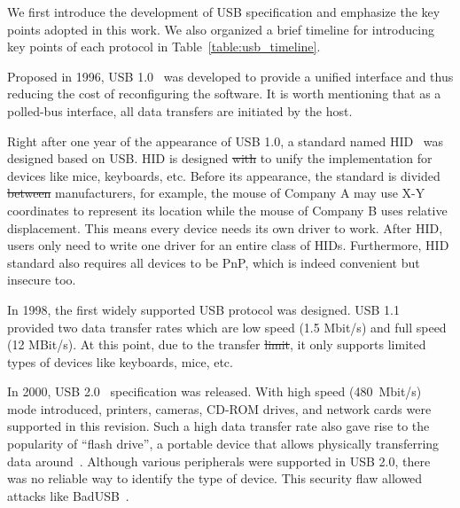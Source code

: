 \documentclass[conference]{IEEEtran}
\newcommand{\outline}[1]{}
\providecommand{\DIFaddtex}[1]{{\protect\color{blue}\uwave{#1}}} %
\providecommand{\DIFdeltex}[1]{{\protect\color{red}\sout{#1}}}                      %
\providecommand{\DIFaddbegin}{} %
\providecommand{\DIFaddend}{} %
\providecommand{\DIFdelbegin}{} %
\providecommand{\DIFdelend}{} %
\providecommand{\DIFadd}[1]{\texorpdfstring{\DIFaddtex{#1}}{#1}} %
\providecommand{\DIFdel}[1]{\texorpdfstring{\DIFdeltex{#1}}{}} %
\newcommand{\DIFscaledelfig}{0.5}
\newlength{\DIFdelgraphicswidth} %
\newlength{\DIFdelgraphicsheight} %
\newcommand{\DIFaddincludegraphics}[2][]{{\color{blue}\fbox{\DIFOincludegraphics[#1]{#2}}}} %
\newcommand{\DIFdelincludegraphics}[2][]{%
\sbox{\DIFdelgraphicsbox}{\DIFOincludegraphics[#1]{#2}}%
\settoboxwidth{\DIFdelgraphicswidth}{\DIFdelgraphicsbox} %
\settoboxtotalheight{\DIFdelgraphicsheight}{\DIFdelgraphicsbox} %
\scalebox{\DIFscaledelfig}{%
\parbox[b]{\DIFdelgraphicswidth}{\usebox{\DIFdelgraphicsbox}\\[-\baselineskip] \rule{\DIFdelgraphicswidth}{0em}}\llap{\resizebox{\DIFdelgraphicswidth}{\DIFdelgraphicsheight}{%
\setlength{\unitlength}{\DIFdelgraphicswidth}%
\begin{picture}(1,1)%
\thicklines\linethickness{2pt} %
{\color[rgb]{1,0,0}\put(0,0){\framebox(1,1){}}}%
{\color[rgb]{1,0,0}\put(0,0){\line( 1,1){1}}}%
{\color[rgb]{1,0,0}\put(0,1){\line(1,-1){1}}}%
\end{picture}%
}\hspace*{3pt}}} %
} %
\DeclareRobustCommand{\DIFaddbegin}{\DIFOaddbegin \let\includegraphics\DIFaddincludegraphics} %
\DeclareRobustCommand{\DIFaddend}{\DIFOaddend \let\includegraphics\DIFOincludegraphics} %
\DeclareRobustCommand{\DIFdelbegin}{\DIFOdelbegin \let\includegraphics\DIFdelincludegraphics} %
\DeclareRobustCommand{\DIFdelend}{\DIFOaddend \let\includegraphics\DIFOincludegraphics} %
\begin{document}
We first introduce the development of \ac{USB} specification and emphasize the key
points adopted in this work. We also organized a brief timeline for introducing
key points of each protocol in Table~\ref{table:usb_timeline}.

Proposed in 1996, \ac{USB} 1.0~\cite{usb10} was developed to provide a unified
interface and thus reducing the cost of reconfiguring the software. It is
worth mentioning that as a polled-bus interface, all data transfers are
initiated by the host.

Right after one year of the appearance of \ac{USB} 1.0, a standard named \acf{HID}~\cite{hid} was designed based on \ac{USB}. \ac{HID} is
designed \DIFdelbegin \DIFdel{with }\DIFdelend to unify the implementation for devices like mice,
keyboards, etc. Before its appearance, the standard is divided \DIFdelbegin \DIFdel{between
}\DIFdelend \DIFaddbegin \DIFadd{among
}\DIFaddend manufacturers, for example, the mouse of Company A may use X-Y coordinates to
represent its location while the mouse of Company B uses relative displacement.
This means every device needs its own driver to work. After \ac{HID}, users only need to
write one driver for an entire class of \acp{HID}. Furthermore, \DIFaddbegin \DIFadd{the }\DIFaddend \ac{HID} standard also
requires all devices to be \ac{PnP}, which is indeed
convenient but insecure too.

In 1998, the first widely supported \ac{USB} protocol was designed. \ac{USB} 1.1~\cite{usb11}
provided two data transfer rates which are low speed (1.5 Mbit/s) and full
speed (12 MBit/s). At this point, due to the transfer \DIFdelbegin \DIFdel{limit}\DIFdelend \DIFaddbegin \DIFadd{limitation}\DIFaddend , it only supports
limited types of devices like keyboards, mice, etc.

In 2000, \DIFaddbegin \DIFadd{the }\DIFaddend \ac{USB} 2.0~\cite{usb20} specification was released. With high speed \mbox{(480
Mbit/s)} mode introduced, printers, cameras, CD-ROM drives, and network cards were
supported in this revision. Such a high data transfer rate also gave rise to the
popularity of ``flash drive'', a portable device that allows physically
transferring data around~\cite{sok}. Although various peripherals were supported
in \ac{USB} 2.0, there was no reliable way to identify the type of device. This
security flaw allowed attacks like BadUSB~\cite{badusb,rubber}.
\end{document}
